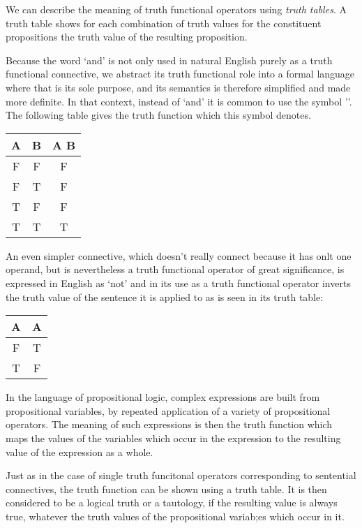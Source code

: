 \documentclass[10pt,titlepage]{article}
\begin{document}
We can describe the meaning of truth functional operators using \emph{truth tables}.
A truth table shows for each combination of truth values for the constituent propositions the truth value of the resulting proposition.

Because the word `and' is not only used in natural English purely as a truth functional connective, we abstract its truth functional role into a formal language where that is its sole purpose, and its semantics is therefore simplified and made more definite.
In that context, instead of `and' it is common to use the symbol '\land'.
The following table gives the truth function which this symbol denotes.

\begin{center}
  \begin{tabular}{c|c|c}
 A & B & A \land{} B\\
 \hline
 F & F & F\\
 F & T & F\\
 T & F & F\\
 T & T & T\\
 \end{tabular}
\end{center}

An even simpler connective, which doesn't really connect because it has onlt one operand, but is nevertheless a truth functional operator of great significance, is expressed in English as `not' and in its use as a truth functional operator inverts the truth value of the sentence it is applied to as is seen in its truth table:


\begin{center}
  \begin{tabular}{c|c}
 A &\lnot{} A\\
 \hline
 F & T\\
 T & F\\
 \end{tabular}
\end{center}


In the language of propositional logic, complex expressions are built from propositional variables, by repeated application of a variety of propositional operators.
The meaning of such expressions is then the truth function which maps the values of the variables which occur in the expression to the resulting value of the expression as a whole.

Just as in the case of single truth funcitonal operators corresponding to sentential connectives, the truth function can be shown using a truth table.
It is then considered to be a logical truth or a tautology, if the resulting value is always true, whatever the truth values of the propositional variab;es which occur in it.
\end{document}
